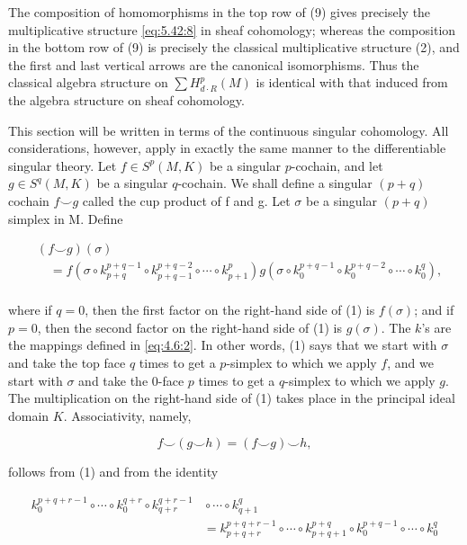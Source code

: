 The composition of homomorphisms in the top row of (9) gives precisely the multiplicative structure \eqref{eq:5.42:8} in sheaf cohomology; whereas the composition in the bottom row of (9) is precisely the classical multiplicative structure (2), and the first and last vertical arrows are the canonical isomorphisms. Thus the classical algebra structure on $\sum H_{d \cdot R}^{p}(M)$ is identical with that induced from the algebra structure on sheaf cohomology.

\label{thm:5.44}This section will be written in terms of the continuous singular cohomology. All considerations, however, apply in exactly the same manner to the differentiable singular theory. Let $f\in S^{p}(M,K)$ be a singular $p$-cochain, and let $g\in S^{q}(M,K)$ be a singular $q$-cochain. We shall define a singular  $ (p+q) $ cochain  $ f\smile g $ called the cup product of f and g. Let  $ \sigma $ be a singular  $ (p+q) $ simplex in M. Define

\begin{equation}
\tag{1}\label{eq:5.44:1}
\begin{aligned}{}&{{}(f\smallsmile g)(\sigma)}\\ {}&{{}\quad=f(\sigma\circ k_{p+q}^{p+q-1}\circ k_{p+q-1}^{p+q-2}\circ\cdots\circ k_{p+1}^{p})g(\sigma\circ k_{0}^{p+q-1}\circ k_{0}^{p+q-2}\circ\cdots\circ k_{0}^{q}),}\\ \end{aligned}
\end{equation}

where if $q=0$, then the first factor on the right-hand side of (1) is $f(\sigma)$; and if $p=0$, then the second factor on the right-hand side of (1) is $g(\sigma)$. The $k$'s are the mappings defined in \eqref{eq:4.6:2}. In other words, (1) says that we start with $\sigma$ and take the top face $q$ times to get a $p$-simplex to which we apply $f$, and we start with $\sigma$ and take the 0-face $p$ times to get a $q$-simplex to which we apply $g$. The multiplication on the right-hand side of (1) takes place in the principal ideal domain $K$. Associativity, namely,

\begin{equation}
\tag{2}\label{eq:5.44:2}
f\smallsmile(g\smallsmile h)=(f\smallsmile g)\smallsmile h,
\end{equation}

follows from (1) and from the identity

\begin{equation}
\tag{3}\label{eq:5.44:3}
\begin{aligned}{k_{0}^{p+q+r-1}\circ\cdots\circ k_{0}^{q+r}\circ k_{q+r}^{q+r-1}}&{{}\circ\cdots\circ k_{q+1}^{q}}\\ {}&{{}=k_{p+q+r}^{p+q+r-1}\circ\cdots\circ k_{p+q+1}^{p+q}\circ k_{0}^{p+q-1}\circ\cdots\circ k_{0}^{q}}\\ \end{aligned}
\end{equation}

